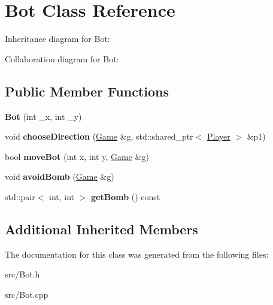 \hypertarget{class_bot}{}\section{Bot Class Reference}
\label{class_bot}


Inheritance diagram for Bot\+:


Collaboration diagram for Bot\+:
\subsection*{Public Member Functions}
\begin{DoxyCompactItemize}
\item 
\mbox{\label{class_bot_a1b9e1cae5a709f9fe6b2a309efeaf503}} 
{\bfseries Bot} (int \+\_\+x, int \+\_\+y)
\item 
\mbox{\label{class_bot_a65f130c059241a49cf54d7885ef5012a}} 
void {\bfseries choose\+Direction} (\mbox{\hyperlink{class_game}{Game}} \&g, std\+::shared\+\_\+ptr$<$ \mbox{\hyperlink{class_player}{Player}} $>$ \&p1)
\item 
\mbox{\label{class_bot_a0ea0c34c6b9e2152a3412ae428369ea3}} 
bool {\bfseries move\+Bot} (int x, int y, \mbox{\hyperlink{class_game}{Game}} \&g)
\item 
\mbox{\label{class_bot_a963684a12ca82a1b8b9a60c28984b9d5}} 
void {\bfseries avoid\+Bomb} (\mbox{\hyperlink{class_game}{Game}} \&g)
\item 
\mbox{\label{class_bot_a25e6c6d90f2afaa72c6a331b1115a23c}} 
std\+::pair$<$ int, int $>$ {\bfseries get\+Bomb} () const
\end{DoxyCompactItemize}
\subsection*{Additional Inherited Members}


The documentation for this class was generated from the following files\+:\begin{DoxyCompactItemize}
\item 
src/Bot.\+h\item 
src/Bot.\+cpp\end{DoxyCompactItemize}

